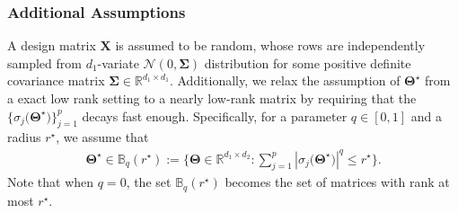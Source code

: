 \documentclass[alpha-refs]{wiley-article}
\begin{document}
\subsubsection{Additional Assumptions}
A design matrix $\boldsymbol{X}$ is assumed to be random, whose rows are independently sampled from $d_{1}$-variate $\mathcal{N}(0,\boldsymbol{\Sigma})$ distribution for some positive definite covariance matrix $\boldsymbol{\Sigma}\in\mathbb{R}^{d_{1} \times d_{1}}$.
Additionally, we relax the assumption of $\boldsymbol{\Theta}^{\star}$ from a exact low rank setting to a nearly low-rank matrix by requiring that the $\{\sigma_{j}\big(\boldsymbol{\Theta}^{\star}\big)\}_{j=1}^{p}$ decays fast enough.
Specifically, for a parameter $q\in[0,1]$ and a radius $r^{\star}$, we assume that
\begin{align*}
    \boldsymbol{\Theta}^{\star} \in \mathbb{B}_{q}(r^{\star})
    := \bigg\{ \boldsymbol{\Theta}\in\mathbb{R}^{d_{1} \times d_{2}} : 
    \sum_{j=1}^{p} \left| \sigma_{j}\big(\boldsymbol{\Theta}^{\star} \big) \right|^{q} \leq r^{\star}
    \bigg\}.
\end{align*}
Note that when $q=0$, the set $\mathbb{B}_{q}(r^{\star})$ becomes the set of matrices with rank at most $r^{\star}$. 
\end{document}
